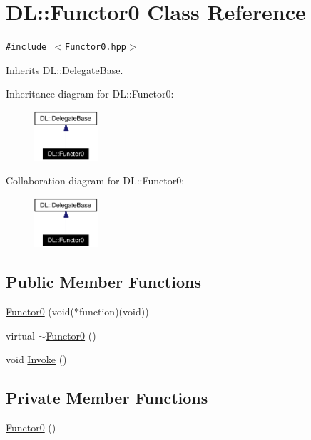 \hypertarget{classDL_1_1Functor0}{
\section{DL::Functor0 Class Reference}
\label{classDL_1_1Functor0}
}
{\tt \#include $<$Functor0.hpp$>$}

Inherits \hyperlink{classDL_1_1DelegateBase}{DL::Delegate\-Base}.

Inheritance diagram for DL::Functor0:\begin{figure}[H]
\begin{center}
\leavevmode
\includegraphics[width=67pt]{classDL_1_1Functor0__inherit__graph}
\end{center}
\end{figure}
Collaboration diagram for DL::Functor0:\begin{figure}[H]
\begin{center}
\leavevmode
\includegraphics[width=67pt]{classDL_1_1Functor0__coll__graph}
\end{center}
\end{figure}
\subsection*{Public Member Functions}
\begin{CompactItemize}
\item 
\hyperlink{classDL_1_1Functor0_a0}{Functor0} (void($\ast$function)(void))
\item 
virtual \hyperlink{classDL_1_1Functor0_a1}{$\sim$Functor0} ()
\item 
void \hyperlink{classDL_1_1Functor0_a2}{Invoke} ()
\end{CompactItemize}
\subsection*{Private Member Functions}
\begin{CompactItemize}
\item 
\hyperlink{classDL_1_1Functor0_d0}{Functor0} ()
\end{CompactItemize}
